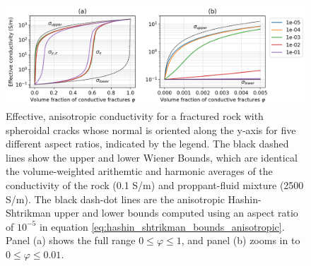\begin{figure}
    \begin{center}
    \includegraphics[width=\columnwidth]{figures/phys_prop_model/aligned_fractures.png}
    \end{center}
\caption{
    Effective, anisotropic conductivity for a fractured rock with spheroidal
    cracks whose normal is oriented along the y-axis for five different aspect ratios, indicated by the legend.
    The black dashed lines show the upper and lower
    Wiener Bounds, which are identical the volume-weighted arithemtic and harmonic averages of the
    conductivity of the rock (0.1 S/m) and proppant-fluid mixture (2500 S/m). The black dash-dot lines
    are the anisotropic Hashin-Shtrikman upper and lower bounds computed using an aspect ratio of $10^{-5}$ in
    equation \ref{eq:hashin_shtrikman_bounds_anisotropic}.
    Panel (a) shows the
    full range $0 \leq \varphi \leq 1$, and panel (b) zooms in to $0 \leq \varphi \leq 0.01$.
}
\label{fig:aligned_fractures}
\end{figure}
